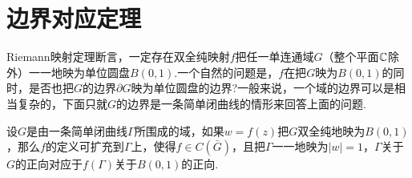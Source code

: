 \section{边界对应定理\label{sec7.3}}
Riemann映射定理断言，一定存在双全纯映射$f$把任一单连通域$G$（整个平面$\mathbb C$除外）一一地映为单位圆盘$B(0,1)$.一个自然的问题是，$f$在把$G$映为$B(0,1)$的同时，是否也把$G$的边界$\partial G$映为单位圆盘的边界?一般来说，一个域的边界可以是相当复杂的，下面只就$G$的边界是一条简单闭曲线的情形来回答上面的问题.
\begin{theorem}\label{thm7.3.1}
  设$G$是由一条简单闭曲线$\Gamma$所围成的域，如果$w=f(z)$把$G$双全纯地映为$B(0,1)$，那么$f$的定义可扩充到$\Gamma$上，使得$f\in C(\bar G)$，且把$\Gamma$一一地映为$|w|=1$，$\Gamma$关于$G$的正向对应于$f(\Gamma)$关于$B(0,1)$的正向.
\end{theorem}
